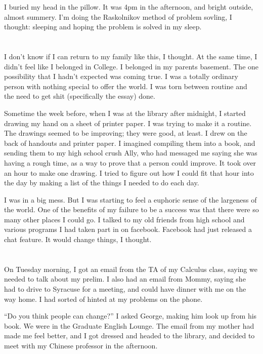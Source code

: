I buried my head in the pillow.  It was 4pm in the afternoon, and bright
outside, almost summery.  I'm doing the Raskolnikov method of problem sovling, I
thought: sleeping and hoping the problem is solved in my sleep.

\section{}

I don't know if I can return to my family like this, I thought.  At the same
time, I didn't feel like I belonged in College.  I belonged in my parents
basement.  The one possibility that I hadn't expected was coming true.  I was a
totally ordinary person with nothing special to offer the world.  I was torn
between routine and the need to get shit (specifically the essay) done.    

Sometime the week before, when I was at the library after midnight, I started
drawing my hand on a sheet of printer paper.  I was trying to make it a routine.
The drawings seemed to be improving; they were good, at least.  I drew on the
back of handouts and printer paper.  I imagined compiling them into a book, and
sending them to my high school crush Ally, who had messaged me saying she was
having a rough time, as a way to prove that a person could improve.  It took
over an hour to make one drawing.  I tried to figure out how I could fit that
hour into the day by making a list of the things I needed to do each day. 

I was in a big mess.  But I was starting to feel a euphoric sense of the
largeness of the world.  One of the benefits of my failure to be a success was
that there were so many other places I could go.  I talked to my old friends
from high school and various programs I had taken part in on facebook.  Facebook
had just released a chat feature.  It would change things, I thought.

\section{}

On Tuesday morning, I got an email from the TA of my Calculus class, saying we needed to
talk about my prelim.  I also had an email from Mommy, saying she had to drive
to Syracuse for a meeting, and could have dinner with me on the way home.  I had
sorted of hinted at my problems on the phone.  

``Do you think people can change?'' I asked George, making him look up from his
book.  We were in the Graduate English Lounge.  The email from my mother had
made me feel better, and I got dressed and headed to the library, and decided to
meet with my Chinese professor in the afternoon.

